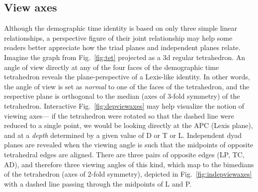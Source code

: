 \documentclass{bmcart}
\begin{document}
\subsection*{View axes}
\label{sec:viewaxes}
 Although the demographic time identity is based on only three simple linear relationships, a perspective figure of their joint relationship may help some readers better appreciate how the triad planes and independent planes relate. Imagine the graph from Fig.~\ref{fig:tet} projected as a 3d regular tetrahedron. An angle of view directly at any of the four faces of the demographic time tetrahedron reveals the plane-perspective of a Lexis-like identity. In other words, the angle of view is set as \emph{normal} to one of the faces of the tetrahedron, and the respective plane is orthogonal to the median (axes of 3-fold symmetry) of the tetrahedron. Interactive Fig.~\ref{fig:depviewaxes} may help visualize the notion of viewing axes--- if the tetrahedron were rotated so that the dashed line were reduced to a single point, we would be looking directly at the APC (Lexis plane), and at a \emph{depth} determined by a given value of D or T or L. Independent dyad planes are revealed when the viewing angle is such that the midpoints of opposite tetrahedral edges are aligned. There are three pairs of opposite edges (LP, TC, AD), and therefore three viewing angles of this kind, which map to the bimedians of the tetrahedron (axes of 2-fold symmetry), depicted in Fig.~\ref{fig:indepviewaxes} with a dashed line passing through the midpoints of L and P.
\end{document}

